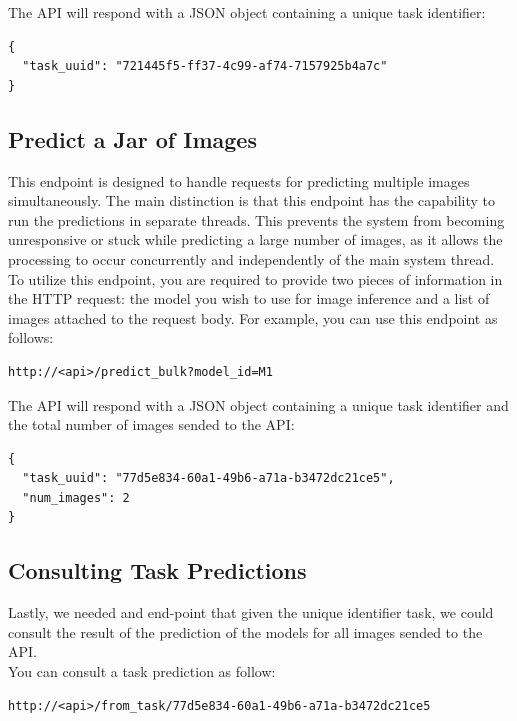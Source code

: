 The API will respond with a JSON object containing a unique task identifier:

\begin{Verbatim}[fontsize=\scriptsize]
{
  "task_uuid": "721445f5-ff37-4c99-af74-7157925b4a7c"
}
\end{Verbatim}


\subsection{Predict a Jar of Images}

This endpoint is designed to handle requests for predicting multiple images
simultaneously. The main distinction is that this endpoint has the capability
to run the predictions in separate threads. This prevents the system from
becoming unresponsive or stuck while predicting a large number of images, as it
allows the processing to occur concurrently and independently of the main
system thread. \\

To utilize this endpoint, you are required to provide two pieces of information
in the HTTP request: the model you wish to use for image inference and a list
of images attached to the request body. For example, you can use this endpoint
as follows:

\begin{Verbatim}[fontsize=\scriptsize]
http://<api>/predict_bulk?model_id=M1
\end{Verbatim}

The API will respond with a JSON object containing a unique task identifier
and the total number of images sended to the API:

\begin{Verbatim}[fontsize=\scriptsize]
{
  "task_uuid": "77d5e834-60a1-49b6-a71a-b3472dc21ce5",
  "num_images": 2
}
\end{Verbatim}


\subsection{Consulting Task Predictions}

Lastly, we needed and end-point that given the unique identifier task,
we could consult the result of the prediction of the models for all images
sended to the API. \\

You can consult a task prediction as follow:

\begin{Verbatim}[fontsize=\scriptsize]
http://<api>/from_task/77d5e834-60a1-49b6-a71a-b3472dc21ce5
\end{Verbatim}

